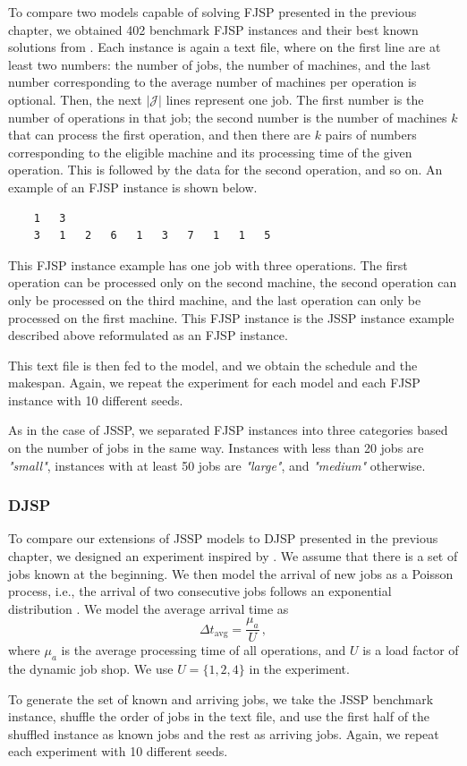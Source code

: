 To compare two models capable of solving FJSP presented in the previous chapter, we obtained 402 benchmark FJSP instances and their best known solutions from \cite{fjsp_benchmarks}. Each instance is again a text file, where on the first line are at least two numbers: the number of jobs, the number of machines, and the last number corresponding to the average number of machines per operation is optional. Then, the next $|\mathcal{J}|$ lines represent one job. The first number is the number of operations in that job; the second number is the number of machines $k$ that can process the first operation, and then there are $k$ pairs of numbers corresponding to the eligible machine and its processing time of the given operation. This is followed by the data for the second operation, and so on. An example of an FJSP instance is shown below.
\begin{verbatim}
    1   3
    3   1   2   6   1   3   7   1   1   5   
\end{verbatim}
This FJSP instance example has one job with three operations. The first operation can be processed only on the second machine, the second operation can only be processed on the third machine, and the last operation can only be processed on the first machine. This FJSP instance is the JSSP instance example described above reformulated as an FJSP instance.
\par 
This text file is then fed to the model, and we obtain the schedule and the makespan. Again, we repeat the experiment for each model and each FJSP instance with 10 different seeds.
\par
As in the case of JSSP, we separated FJSP instances into three categories based on the number of jobs in the same way. Instances with less than 20 jobs are \textit{"small"}, instances with at least 50 jobs are \textit{"large"}, and \textit{"medium"} otherwise.

\subsubsection*{DJSP}
To compare our extensions of JSSP models to DJSP presented in the previous chapter, we designed an experiment inspired by \cite{djsp_experiment_design}. We assume that there is a set of jobs known at the beginning. We then model the arrival of new jobs as a Poisson process, i.e., the arrival of two consecutive jobs follows an exponential distribution \cite{djsp_experiment_design}. We model the average arrival time as 
\begin{equation}
    \Delta t_\text{avg} = \frac{\mu_a}{U} \, ,
\end{equation}
where $\mu_a$ is the average processing time of all operations, and $U$ is a load factor of the dynamic job shop. We use $U = \{1,2,4 \}$ in the experiment. 
\par
To generate the set of known and arriving jobs, we take the JSSP benchmark instance, shuffle the order of jobs in the text file, and use the first half of the shuffled instance as known jobs and the rest as arriving jobs. Again, we repeat each experiment with 10 different seeds.

